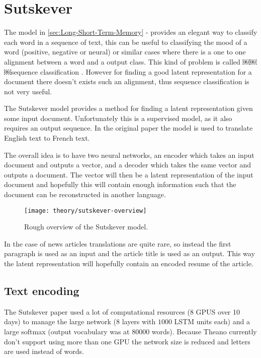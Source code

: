 
\section{Sutskever}

The model in \autoref{sec:Long-Short-Term-Memory} -  provides an elegant way to classify each word in a sequence of text, this can be useful to classifying the mood of a word (positive, negative or neural) or similar cases where there is a one to one alignment between a word and a output class. This kind of problem is called ￼￼￼sequence classification \cite[p.~10]{alexgraves}. However for finding a good latent representation for a document there doesn't exists such an alignment, thus sequence classification is not very useful.

The Sutskever model provides a method for finding a latent representation given some input document. Unfortunately this is a supervised model, as it also requires an output sequence. In the original paper \cite{sutskever} the model is used to translate English text to French text.

The overall idea is to have two neural networks, an encoder which takes an input document and outputs a vector, and a decoder which takes the same vector and outputs a document. The vector will then be a latent representation of the input document and hopefully this will contain enough information such that the document can be reconstructed in another language.

\begin{figure}[H]
	\centering
	\texttt{[image: theory/sutskever-overview]}
	\caption{Rough overview of the Sutskever model.}
\end{figure}

In the case of news articles translations are quite rare, so instead the first paragraph is used as an input and the article title is used as an output. This way the latent representation will hopefully contain an encoded resume of the article.

\subsection{Text encoding}

The Sutskever paper \cite{sutskever} used a lot of computational resources (8 GPUS over 10 days) to manage the large network (8 layers with $1000$ LSTM units each) and a large softmax (output vocabulary was at 80000 words). Because Theano currently don't support using more than one GPU the network size is reduced and letters are used instead of words.


